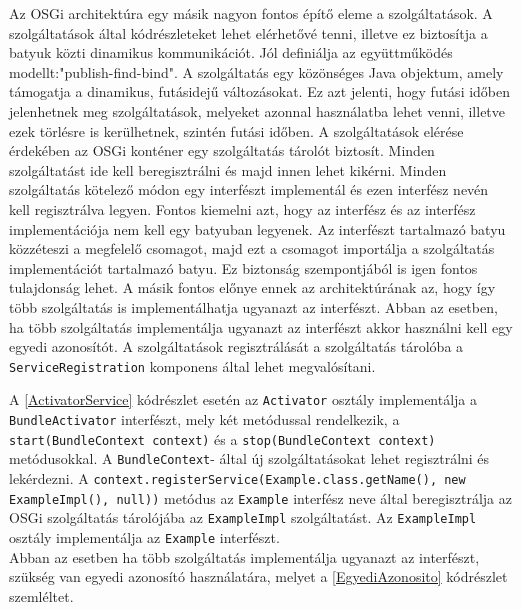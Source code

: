 Az OSGi architektúra egy másik nagyon fontos építő eleme a szolgáltatások. A szolgáltatások által kódrészleteket lehet elérhetővé tenni, illetve ez biztosítja a batyuk közti dinamikus kommunikációt. Jól definiálja az együttműködés modellt:"publish-find-bind". A szolgáltatás egy közönséges Java objektum, amely támogatja a dinamikus, futásidejű változásokat. Ez azt jelenti, hogy futási időben jelenhetnek meg szolgáltatások, melyeket azonnal használatba lehet venni, illetve ezek törlésre is kerülhetnek, szintén futási időben. A szolgáltatások elérése érdekében az OSGi konténer egy szolgáltatás tárolót biztosít. Minden szolgáltatást ide kell beregisztrálni és majd innen lehet kikérni. Minden szolgáltatás kötelező módon egy interfészt implementál és ezen interfész nevén kell regisztrálva legyen. Fontos kiemelni azt, hogy az interfész és az interfész implementációja nem kell egy batyuban legyenek. Az interfészt tartalmazó batyu közzéteszi a megfelelő csomagot, majd ezt a csomagot importálja a szolgáltatás implementációt tartalmazó batyu. Ez biztonság szempontjából is igen fontos tulajdonság lehet. A másik fontos előnye ennek az architektúrának az, hogy így több szolgáltatás is implementálhatja ugyanazt az interfészt. Abban az esetben, ha több szolgáltatás implementálja ugyanazt az interfészt akkor használni kell egy egyedi azonosítót. A szolgáltatások regisztrálását a szolgáltatás tárolóba a \texttt{ServiceRegistration} komponens által lehet megvalósítani.

%



A \ref{ActivatorService} kódrészlet esetén az \texttt{Activator} osztály implementálja a \texttt{BundleActivator} interfészt, mely két metódussal rendelkezik, a \texttt{start(BundleContext context)} és a \texttt{stop(BundleContext context)} metódusokkal. A \texttt{BundleContext}- által új szolgáltatásokat lehet regisztrálni és lekérdezni. A \texttt{context.registerService(Example.class.getName(), new ExampleImpl(), null))} metódus az \texttt{Example} interfész neve által beregisztrálja az OSGi szolgáltatás tárolójába az \texttt{ExampleImpl} szolgáltatást. Az \texttt{ExampleImpl} osztály implementálja az \texttt{Example} interfészt.
\\Abban az esetben ha több szolgáltatás implementálja ugyanazt az interfészt, szükség van egyedi azonosító használatára, melyet a \ref{EgyediAzonosito} kódrészlet szemléltet.

